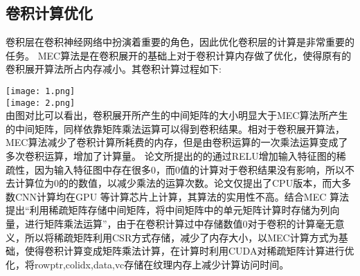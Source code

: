 \documentclass[a4paper,11pt,onecolumn,towside]{article}
\begin{document}
\begin{CJK*}{GBK}{song}
\begin{multicols}{2}
\section{卷积计算优化}
卷积层在卷积神经网络中扮演着重要的角色，因此优化卷积层的计算是非常重要的任务。
MEC算法\cite{MEC}是在卷积展开的基础上对于卷积计算内存做了优化，使得原有的卷积展开算法所占内存减小。其卷积计算过程如下:



\texttt{[image: 1.png]} \\
\texttt{[image: 2.png]} \\

由图对比可以看出，卷积展开所产生的中间矩阵的大小明显大于MEC算法所产生的中间矩阵，同样依靠矩阵乘法运算可以得到卷积结果。相对于卷积展开算法，MEC算法减少了卷积计算所耗费的内存，但是由卷积运算的一次乘法运算变成了多次卷积运算，增加了计算量。
论文\cite{RLU}所提出的的通过RELU增加输入特征图的稀疏性，因为输入特征图中存在很多0，而0值的计算对于卷积结果没有影响，所以不去计算位为0的的数值，以减少乘法的运算次数。论文仅提出了CPU版本，而大多数CNN计算均在GPU 等计算芯片上计算，其算法的实用性不高。结合MEC 算法提出“利用稀疏矩阵存储中间矩阵，将中间矩阵中的单元矩阵计算时存储为列向量，进行矩阵乘法运算”，由于在卷积计算过中存储数值0对于卷积的计算毫无意义，所以将稀疏矩阵利用CSR方式存储，减少了内存大小，以MEC计算方式为基础，使得卷积计算变成矩阵乘法计算，在计算时利用CUDA对稀疏矩阵计算进行优化，将rowptr,colidx,data,vc存储在纹理内存上减少计算访问时间。

\small
\renewcommand\refname{参考文献}


\end{multicols}
\clearpage
\end{CJK*}
\end{document}
